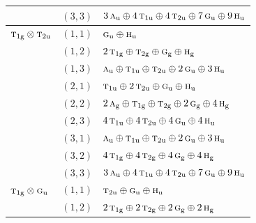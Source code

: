 \documentclass[11pt]{article}
\newcommand{\irr}[1]{\text{\normalfont\scshape #1}}
\newcommand{\ptag}[1]{\mathrm{#1}}
\begin{document}
\begin{longtable}{p{} c p{}}
 & $(3,3)$ & $3\,\irr{a}_{\ptag{u}}\oplus 4\,\irr{t}_{1\ptag{u}}\oplus 4\,\irr{t}_{2\ptag{u}}\oplus 7\,\irr{g}_{\ptag{u}}\oplus 9\,\irr{h}_{\ptag{u}}$\\

\hline

$\irr{t}_{1\ptag{g}}\otimes \irr{t}_{2\ptag{u}}$ & $(1,1)$ & $\irr{g}_{\ptag{u}}\oplus \irr{h}_{\ptag{u}}$\\

 & $(1,2)$ & $2\,\irr{t}_{1\ptag{g}}\oplus \irr{t}_{2\ptag{g}}\oplus \irr{g}_{\ptag{g}}\oplus \irr{h}_{\ptag{g}}$\\

 & $(1,3)$ & $\irr{a}_{\ptag{u}}\oplus \irr{t}_{1\ptag{u}}\oplus \irr{t}_{2\ptag{u}}\oplus 2\,\irr{g}_{\ptag{u}}\oplus 3\,\irr{h}_{\ptag{u}}$\\

 & $(2,1)$ & $\irr{t}_{1\ptag{u}}\oplus 2\,\irr{t}_{2\ptag{u}}\oplus \irr{g}_{\ptag{u}}\oplus \irr{h}_{\ptag{u}}$\\

 & $(2,2)$ & $2\,\irr{a}_{\ptag{g}}\oplus \irr{t}_{1\ptag{g}}\oplus \irr{t}_{2\ptag{g}}\oplus 2\,\irr{g}_{\ptag{g}}\oplus 4\,\irr{h}_{\ptag{g}}$\\

 & $(2,3)$ & $4\,\irr{t}_{1\ptag{u}}\oplus 4\,\irr{t}_{2\ptag{u}}\oplus 4\,\irr{g}_{\ptag{u}}\oplus 4\,\irr{h}_{\ptag{u}}$\\

 & $(3,1)$ & $\irr{a}_{\ptag{u}}\oplus \irr{t}_{1\ptag{u}}\oplus \irr{t}_{2\ptag{u}}\oplus 2\,\irr{g}_{\ptag{u}}\oplus 3\,\irr{h}_{\ptag{u}}$\\

 & $(3,2)$ & $4\,\irr{t}_{1\ptag{g}}\oplus 4\,\irr{t}_{2\ptag{g}}\oplus 4\,\irr{g}_{\ptag{g}}\oplus 4\,\irr{h}_{\ptag{g}}$\\

 & $(3,3)$ & $3\,\irr{a}_{\ptag{u}}\oplus 4\,\irr{t}_{1\ptag{u}}\oplus 4\,\irr{t}_{2\ptag{u}}\oplus 7\,\irr{g}_{\ptag{u}}\oplus 9\,\irr{h}_{\ptag{u}}$\\

\hline

$\irr{t}_{1\ptag{g}}\otimes \irr{g}_{\ptag{u}}$ & $(1,1)$ & $\irr{t}_{2\ptag{u}}\oplus \irr{g}_{\ptag{u}}\oplus \irr{h}_{\ptag{u}}$\\

 & $(1,2)$ & $2\,\irr{t}_{1\ptag{g}}\oplus 2\,\irr{t}_{2\ptag{g}}\oplus 2\,\irr{g}_{\ptag{g}}\oplus 2\,\irr{h}_{\ptag{g}}$\\


\end{longtable}
\end{document}
